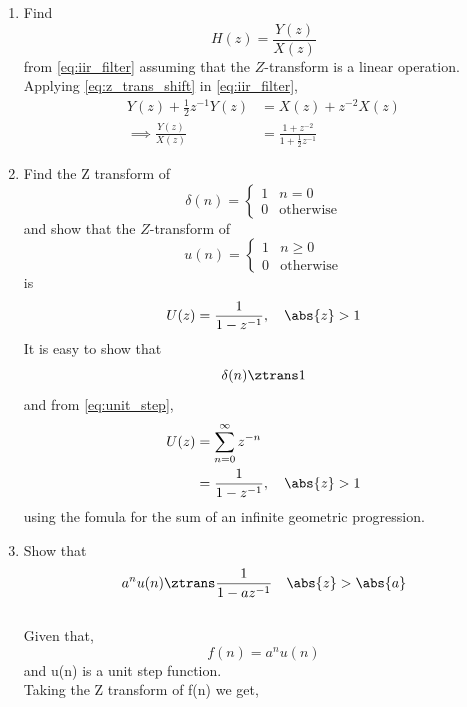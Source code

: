\documentclass[journal,12pt,twocolumn]{IEEEtran}
\renewcommand\thesection{\arabic{section}}
\begin{document}
\begin{enumerate}[label=\thesection.\arabic*]
\item Find
%
\begin{equation}
H(z) = \frac{Y(z)}{X(z)}
\end{equation}
%
from  \eqref{eq:iir_filter} assuming that the $Z$-transform is a linear operation.
\\
\solution  Applying \eqref{eq:z_trans_shift} in \eqref{eq:iir_filter},
\begin{align}
Y(z) + \frac{1}{2}z^{-1}Y(z) &= X(z)+z^{-2}X(z)
\\
\implies \frac{Y(z)}{X(z)} &= \frac{1 + z^{-2}}{1 + \frac{1}{2}z^{-1}}
\label{eq:freq_resp}
\end{align}
%
\item Find the Z transform of 
\begin{equation}
\delta(n)
=
\begin{cases}
1 & n = 0
\\
0 & \text{otherwise}
\end{cases}
\end{equation}
and show that the $Z$-transform of
\begin{equation}
\label{eq:unit_step}
u(n)
=
\begin{cases}
1 & n \ge 0
\\
0 & \text{otherwise}
\end{cases}
\end{equation}
is
\begin{equation}
U(z) = \frac{1}{1-z^{-1}}, \quad \abs{z} > 1
\end{equation}
\solution It is easy to show that
\begin{equation}
\delta(n) \ztrans 1
\end{equation}
and from \eqref{eq:unit_step},
\begin{align}
U(z) &= \sum _{n= 0}^{\infty}z^{-n}
\\
&=\frac{1}{1-z^{-1}}, \quad \abs{z} > 1
\end{align}
using the fomula for the sum of an infinite geometric progression.
%
\item Show that 
\begin{equation}
\label{eq:anun}
a^nu(n) \ztrans \frac{1}{1-az^{-1}} \quad \abs{z} > \abs{a}
\end{equation}
\solution \\
Given that,
\begin{equation}
	f(n) =a^nu(n)	
\end{equation} and u(n) is a unit step function.\\ Taking the Z transform of f(n) we get,

\end{enumerate}
\end{document}
